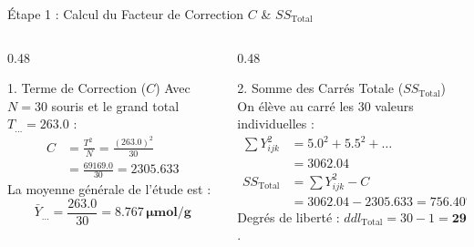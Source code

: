 \documentclass[aspectratio=169,10pt]{beamer}
\begin{document}
\begin{frame}{Étape 1 : Calcul du Facteur de Correction $C$ \& $SS_{\text{Total}}$}
  \begin{columns}[onlytextwidth, T]
    \begin{column}{0.48\linewidth}
      \begin{conceptbox}{1. Terme de Correction ($C$)}
        \small
        Avec $N = 30$ souris et le grand total $T_{\dots} = 263.0$ :
        \begin{align*}
          C &= \frac{T_{\dots}^2}{N} = \frac{(263.0)^2}{30} \\
          &= \frac{69169.0}{30} = \mathbf{2305.633}
        \end{align*}
        La moyenne générale de l'étude est :
        \begin{equation*}
          \bar{Y}_{\dots} = \frac{263.0}{30} = \mathbf{8.767\,\mu\text{mol/g}}
        \end{equation*}
      \end{conceptbox}
    \end{column}
    \begin{column}{0.48\linewidth}
      \begin{conceptbox}{2. Somme des Carrés Totale ($SS_{\text{Total}}$)}
        \small
        On élève au carré les 30 valeurs individuelles :
        \begin{align*}
          \sum Y_{ijk}^2 &= 5.0^2 + 5.5^2 + \dots \\
          &= \mathbf{3062.04} \\[1mm]
          SS_{\text{Total}} &= \sum Y_{ijk}^2 - C \\
          &= 3062.04 - 2305.633 = \mathbf{756.407}
        \end{align*}
        Degrés de liberté : $ddl_{\text{Total}} = 30 - 1 = \mathbf{29}$.
      \end{conceptbox}
    \end{column}
  \end{columns}
\end{frame}
\end{document}
